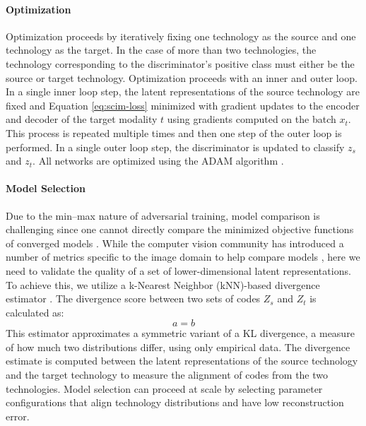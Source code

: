 \paragraph{Optimization}
Optimization proceeds by iteratively fixing one technology as the source and one technology as the target.
In the case of more than two technologies, the technology corresponding to the discriminator’s positive class must either be the source or target technology.
Optimization proceeds with an inner and outer loop.
In a single inner loop step, the latent representations of the source technology are fixed and Equation \ref{eq:scim-loss} minimized with gradient updates to the encoder and decoder of the target modality $t$ using gradients computed on the batch $x_t$.
This process is repeated multiple times and then one step of the outer loop is performed.
In a single outer loop step, the discriminator is updated to classify $z_s$ and $z_t$.
All networks are optimized using the ADAM algorithm \cite{kingma2013}.


\paragraph{Model Selection}
Due to the min–max nature of adversarial training, model comparison is challenging since one cannot directly compare the minimized objective functions of converged models \cite{lucic2017}.
While the computer vision community has introduced a number of metrics specific to the image domain to help compare models \cite{heusel2017,salimans2016}, here we need to validate the quality of a set of lower-dimensional latent representations.
To achieve this, we utilize a k-Nearest Neighbor (kNN)-based divergence estimator \cite{wang2009}.
The divergence score between two sets of codes $Z_s$ and $Z_t$ is calculated as:
\begin{equation}
	a = b
\end{equation}
This estimator approximates a symmetric variant of a KL divergence, a measure of how much two distributions differ, using only empirical data.
The divergence estimate is computed between the latent representations of the source technology and the target technology to measure the alignment of codes from the two technologies.
Model selection can proceed at scale by selecting parameter configurations that align technology distributions and have low reconstruction error.

